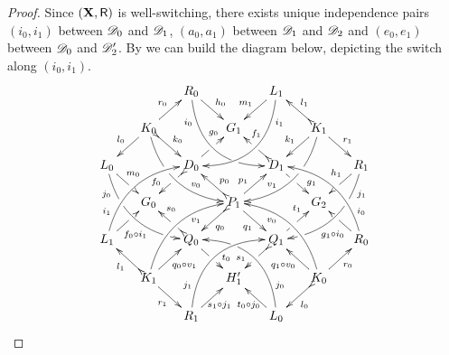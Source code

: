 \begin{proof}

			Since $(\textbf {\textup{X}}, \mathsf{R})$ is well-switching, there exists unique independence pairs 
		$(i_0,i_1)$ between $\mathscr{D}_0$ and $\mathscr{D}_1$,	$(a_0,a_1)$ between $\mathscr{D}_1$ and $\mathscr{D}_2$ and	$(e_0, e_1)$ between $\mathscr{D}_0$ and
		$\mathscr{D}'_2$. 	By  we can build the diagram below, depicting the switch  along  $(i_0, i_1)$.
		\[\xymatrix@C=15pt@R=15pt{&&R_0 \ar@/_.8cm/[ddrr]_(.2){i_0}|(.7)\hole
			\ar[dr]^{h_0}&& L_1\ar@/^.8cm/[ddll]^(.2){i_1}
			\ar[dl]_{m_1}\\&K_0\ar@{>->}[dr]^{k_0}\ar[dl]_{l_0}
			\ar@/_.6cm/[ddrr]|(.36)\hole^(.65){v_0}\ar[ur]^{r_0}&& G_1 &&
			K_1
			\ar@/^.6cm/[ddll]|(.36)\hole_(.65){v_1}\ar[dl]_{k_1}\ar@{>->}[lu]_{l_1}
			\ar[dr]^{r_1}\\L_0
			\ar@/_.6cm/[ddrr]_(.2){j_0}|(.31)\hole|(.81)\hole
			\ar[dr]^(.4){m_0}|(.61)\hole && D_0
			\ar@{>->}[dl]|(.4)\hole_(.65){f_0}\ar[ur]|(.5)\hole^(.7){g_0}&&D_1
			\ar[dr]|(.4)\hole^(.65){g_1}
			\ar@{>->}[ul]|(.5)\hole_(.65){f_1}&&R_1\ar@/^.6cm/[ddll]^(.2){j_1}|(.31)\hole|(.81)\hole\ar[dl]_(.4){h_1}|(.6)\hole\\&G_0
			&&P_1\ar[dr]_{q_1}
			\ar@{>->}[dl]^{q_0}\ar[ur]^(.4){p_1}\ar@{>->}[ul]_(.4){p_0}&&G_2\\L_1
			\ar@/^.6cm/[uurr]^(.2){i_1} \ar[ur]_(.35){f_0\circ
				i_1}|(.61)\hole&&Q_0
			\ar@{>->}[ul]|(.4)\hole_(.65){s_0}\ar[dr]|(.5)\hole^(.65){t_0}
			&&Q_1\ar[ur]|(.4)\hole^(.65){t_1} \ar@{>->}[dl]|(.5)\hole_(.65){s_1}
			&& R_0 \ar[ul]^(.35){g_1\circ
				i_0}|(.61)\hole\ar@/_.6cm/[uull]_(.2){i_0}\\&K_1
			\ar[ur]_{q_0\circ v_1} \ar[dr]_{r_1}
			\ar@{>->}[ul]^{l_1}\ar@/^.6cm/[uurr]_(.65){v_1}&&H'_1&& K_0
			\ar[ur]_{r_0} \ar[ul]^{q_1\circ v_0} \ar@{>->}[dl]^{l_0}
			\ar@/_.6cm/[uull]^(.65){v_0}\\&& R_1
			\ar[ur]_{\hspace{-6pt}s_1\circ
				j_1}\ar@/^.8cm/[uurr]^(.2){j_1}&& L_0 \ar[ul]^{t_0\circ
				j_0\hspace{-6pt}} \ar@/_.8cm/[uull]_(.2){j_0} |(.69)\hole
		}	\]
		

\end{proof}
